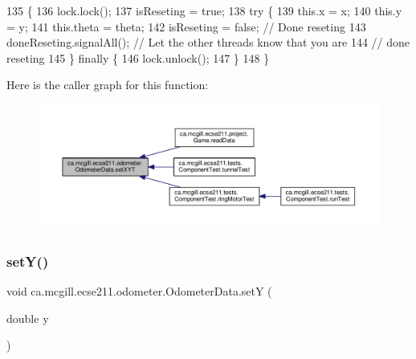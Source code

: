 \begin{DoxyCode}
135                                                        \{
136     lock.lock();
137     isReseting = \textcolor{keyword}{true};
138     \textcolor{keywordflow}{try} \{
139       this.x = x;
140       this.y = y;
141       this.theta = theta;
142       isReseting = \textcolor{keyword}{false}; \textcolor{comment}{// Done reseting}
143       doneReseting.signalAll(); \textcolor{comment}{// Let the other threads know that you are}
144                                 \textcolor{comment}{// done reseting}
145     \} \textcolor{keywordflow}{finally} \{
146       lock.unlock();
147     \}
148   \}
\end{DoxyCode}
Here is the caller graph for this function\+:
\nopagebreak
\begin{figure}[H]
\begin{center}
\leavevmode
\includegraphics[width=350pt]{classca_1_1mcgill_1_1ecse211_1_1odometer_1_1_odometer_data_a2ebc18a13aea6276122d9ef4ee100bb9_icgraph}
\end{center}
\end{figure}
\mbox{\label{classca_1_1mcgill_1_1ecse211_1_1odometer_1_1_odometer_data_a82986438cd462e66520bc62bb4bd2b75}} 
\subsubsection{\texorpdfstring{set\+Y()}{setY()}}
{\footnotesize\ttfamily void ca.\+mcgill.\+ecse211.\+odometer.\+Odometer\+Data.\+setY (\begin{DoxyParamCaption}\item[{double}]{y }\end{DoxyParamCaption})}

